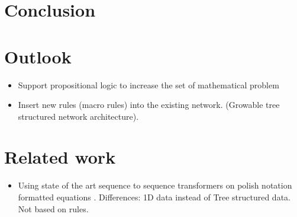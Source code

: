\documentclass{scrartcl}
\begin{document}
\section{Conclusion}

\section{Outlook}
\begin{itemize}
	\item Support propositional logic to increase the set of mathematical problem
	\item Insert new rules (macro rules) into the existing network. (Growable tree structured network architecture). \cite{graves2016hybrid}
\end{itemize}

\section{Related work}

\begin{itemize}
	\item Using state of the art sequence to sequence transformers on polish notation formatted equations \cite{Lample2020Deep}. Differences: 1D data instead of Tree structured data. Not based on rules. 
\end{itemize}

\printbibliography
\end{document}
